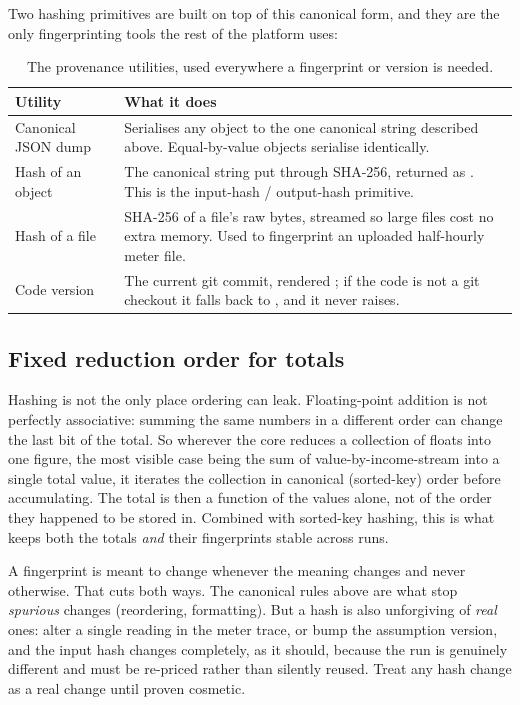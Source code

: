 Two hashing primitives are built on top of this canonical form, and they are the only fingerprinting tools the rest of the platform uses:

\begin{table}[H]
\centering
\caption{The provenance utilities, used everywhere a fingerprint or version is needed.}
\label{tab:utils}
\small\sffamily
\begin{tabularx}{\textwidth}{@{}l L@{}}
\toprule
\textbf{Utility} & \textbf{What it does} \\
\midrule
Canonical JSON dump & Serialises any object to the one canonical string described above. Equal-by-value objects serialise identically. \\
Hash of an object & The canonical string put through SHA-256, returned as . This is the input-hash / output-hash primitive. \\
Hash of a file & SHA-256 of a file's raw bytes, streamed so large files cost no extra memory. Used to fingerprint an uploaded half-hourly meter file. \\
Code version & The current git commit, rendered ; if the code is not a git checkout it falls back to , and it never raises. \\
\bottomrule
\end{tabularx}
\end{table}

\subsection{Fixed reduction order for totals}

Hashing is not the only place ordering can leak. Floating-point addition is not perfectly associative: summing the same numbers in a different order can change the last bit of the total. So wherever the core reduces a collection of floats into one figure, the most visible case being the sum of value-by-income-stream into a single total value, it iterates the collection in canonical (sorted-key) order before accumulating. The total is then a function of the values alone, not of the order they happened to be stored in. Combined with sorted-key hashing, this is what keeps both the totals \emph{and} their fingerprints stable across runs.

\begin{caution}
A fingerprint is meant to change whenever the meaning changes and never otherwise. That cuts both ways. The canonical rules above are what stop \emph{spurious} changes (reordering, formatting). But a hash is also unforgiving of \emph{real} ones: alter a single reading in the meter trace, or bump the assumption version, and the input hash changes completely, as it should, because the run is genuinely different and must be re-priced rather than silently reused. Treat any hash change as a real change until proven cosmetic.
\end{caution}

